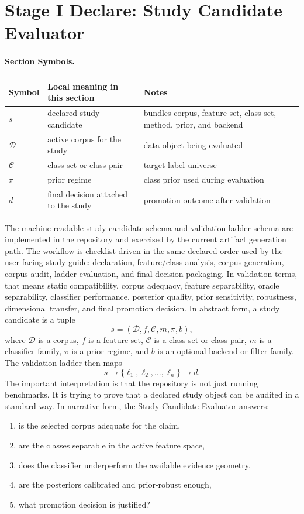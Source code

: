 \documentclass[11pt]{article}
\newcommand{\sectionsymbol}[3]{#1 & #2 & #3 \\}
\newcommand{\sectionsymbols}[1]{%
\begin{center}
\small
\setlength{\tabcolsep}{4pt}
\begin{tabularx}{0.95\textwidth}{>{\raggedright\arraybackslash}p{0.16\textwidth}X>{\raggedright\arraybackslash}p{0.18\textwidth}}
\toprule
Symbol & Local meaning in this section & Notes \\
\midrule
#1
\bottomrule
\end{tabularx}
\end{center}
}
\begin{document}
\section{Stage I Declare: Study Candidate Evaluator}
\paragraph{Section Symbols.}
\sectionsymbols{
\sectionsymbol{\(s\)}{declared study candidate}{bundles corpus, feature set, class set, method, prior, and backend}
\sectionsymbol{\(\mathcal{D}\)}{active corpus for the study}{data object being evaluated}
\sectionsymbol{\(\mathcal{C}\)}{class set or class pair}{target label universe}
\sectionsymbol{\(\pi\)}{prior regime}{class prior used during evaluation}
\sectionsymbol{\(d\)}{final decision attached to the study}{promotion outcome after validation}
}

\noindent
The machine-readable study candidate schema and validation-ladder schema are implemented in the repository and exercised by the current artifact generation path. The workflow is checklist-driven in the same declared order used by the user-facing study guide: declaration, feature/class analysis, corpus generation, corpus audit, ladder evaluation, and final decision packaging. In validation terms, that means static compatibility, corpus adequacy, feature separability, oracle separability, classifier performance, posterior quality, prior sensitivity, robustness, dimensional transfer, and final promotion decision.
In abstract form, a study candidate is a tuple
\begin{equation}
s = (\mathcal{D}, f, \mathcal{C}, m, \pi, b),
\end{equation}
where \(\mathcal{D}\) is a corpus, \(f\) is a feature set, \(\mathcal{C}\) is a class set or class pair, \(m\) is a classifier family, \(\pi\) is a prior regime, and \(b\) is an optional backend or filter family. The validation ladder then maps
\begin{equation}
s \rightarrow \{\ell_1, \ell_2, \dots, \ell_n\} \rightarrow d.
\end{equation}
The important interpretation is that the repository is not just running benchmarks. It is trying to prove that a declared study object can be audited in a standard way. In narrative form, the Study Candidate Evaluator answers:
\begin{enumerate}[leftmargin=1.5em]
  \item is the selected corpus adequate for the claim,
  \item are the classes separable in the active feature space,
  \item does the classifier underperform the available evidence geometry,
  \item are the posteriors calibrated and prior-robust enough,
  \item what promotion decision is justified?
\end{enumerate}
\end{document}
